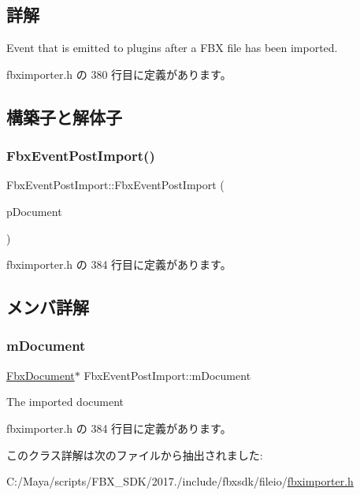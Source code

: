 \subsection{詳解}
Event that is emitted to plugins after a F\+BX file has been imported. 

 fbximporter.\+h の 380 行目に定義があります。



\subsection{構築子と解体子}
\mbox{\label{class_fbx_event_post_import_aefcd44e6871e671e571f3f378ceab40a}} 
\subsubsection{\texorpdfstring{Fbx\+Event\+Post\+Import()}{FbxEventPostImport()}}
{\footnotesize\ttfamily Fbx\+Event\+Post\+Import\+::\+Fbx\+Event\+Post\+Import (\begin{DoxyParamCaption}\item[{\hyperlink{class_fbx_document}{Fbx\+Document} $\ast$}]{p\+Document }\end{DoxyParamCaption})\hspace{0.3cm}{\ttfamily [inline]}}



 fbximporter.\+h の 384 行目に定義があります。



\subsection{メンバ詳解}
\mbox{\label{class_fbx_event_post_import_a9e7d9e8702a8e82a81409d1393845a1a}} 
\subsubsection{\texorpdfstring{m\+Document}{mDocument}}
{\footnotesize\ttfamily \hyperlink{class_fbx_document}{Fbx\+Document}$\ast$ Fbx\+Event\+Post\+Import\+::m\+Document}



The imported document 



 fbximporter.\+h の 384 行目に定義があります。



このクラス詳解は次のファイルから抽出されました\+:\begin{DoxyCompactItemize}
\item 
C\+:/\+Maya/scripts/\+F\+B\+X\+\_\+\+S\+D\+K/2017./include/fbxsdk/fileio/\hyperlink{fbximporter_8h}{fbximporter.\+h}\end{DoxyCompactItemize}
